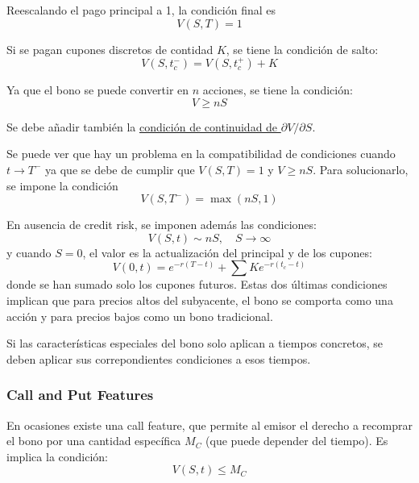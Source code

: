 Reescalando el pago principal a 1, la condición final es
\begin{equation*}
    \boxed{V(S,T)=1}
\end{equation*}

Si se pagan cupones discretos de contidad $K$, se tiene la condición de salto:
\begin{equation*}
    \boxed{V(S, t_c^-) = V(S, t_c^+) + K}
\end{equation*}

Ya que el bono se puede convertir en $n$ acciones, se tiene la condición:
\begin{equation*}
    \boxed{V \geq nS}
\end{equation*}

Se debe añadir también la \underline{condición de continuidad de $\partial V/\partial S$}.

Se puede ver que hay un problema en la compatibilidad de condiciones cuando $t \to T^-$ ya que se debe de cumplir que $V(S,T)=1$ y $V \geq nS$. Para solucionarlo, se impone la condición
\begin{equation*}
    \boxed{V(S,T^-) = \max(nS, 1)}
\end{equation*}

En ausencia de credit risk, se imponen además las condiciones:
\begin{equation*}
    \boxed{V(S, t) \sim nS, \quad S \to \infty}
\end{equation*}
y cuando $S=0$, el valor es la actualización del principal y de los cupones:
\begin{equation*}
    \boxed{V(0, t) = e^{-r(T-t)} + \sum K e^{-r(t_c-t)}}
\end{equation*}
donde se han sumado solo los cupones futuros. Estas dos últimas condiciones implican que para precios altos del subyacente, el bono se comporta como una acción y para precios bajos como un bono tradicional.

Si las características especiales del bono solo aplican a tiempos concretos, se deben aplicar sus correpondientes condiciones a esos tiempos. 


\subsubsection{Call and Put Features}
En ocasiones existe una call feature, que permite al emisor el derecho a recomprar el bono por una cantidad específica $M_C$ (que puede depender del tiempo). Es implica la condición:
\begin{equation*}
    \boxed{V(S,t) \leq M_C}
\end{equation*}

